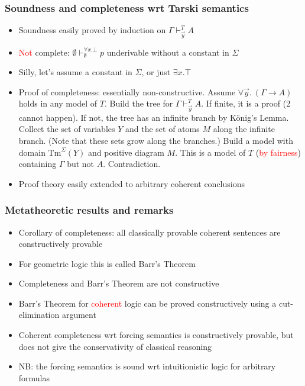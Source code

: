 \documentclass[handout,11pt]{beamer}
\newcommand{\red}[1]{\textcolor{red}{#1}}
\begin{document}
\begin{frame}
\frametitle{Soundness and completeness wrt Tarski semantics}
 \begin{itemize}[<+->]   %
    \item Soundness easily proved by induction on $\Gamma\vdash_{\vec{y}}^T A$
    \item \red{Not} complete: $\emptyset\vdash_{\emptyset}^{\forall x.\bot} p$
    underivable without a constant in $\Sigma$
    \item Silly, let's assume a constant in $\Sigma$, or just $\exists x.\top$
    \item Proof of completeness: essentially non-constructive.
    Assume $\forall\vec{y}.~(\Gamma \to A)$ holds in any model of $T$.
    Build the tree for $\Gamma\vdash_{\vec{y}}^T A$. If finite, 
    it is a proof (2 cannot happen). If not, the tree has an infinite branch
    by K\"onig's Lemma. Collect the set of variables $Y$ and the set
    of atoms $M$ along the infinite branch. 
    (Note that these sets grow along the branches.)
    Build a model with domain
    $\mathrm{Tm}^\Sigma(Y)$ and positive diagram $M$. This is a model of
    $T$ (\red{by fairness}) containing $\Gamma$ but not $A$. Contradiction.
 
    \item Proof theory easily extended to arbitrary coherent conclusions
 \end{itemize}
\end{frame}

\begin{frame}
\frametitle{Metatheoretic results and remarks}
 \begin{itemize}[<+->]   %
    \item Corollary of completeness: 
    all classically provable coherent sentences are constructively provable
    \item For \alert{geometric} logic this is called Barr's Theorem
    \item Completeness and Barr's Theorem are \alert{not} constructive
    \item Barr's Theorem for \red{coherent} logic can be proved 
    constructively using a cut-elimination argument %
    \item Coherent completeness wrt forcing semantics is constructively
    provable, but does not give the conservativity of classical reasoning
    \item NB: the forcing semantics is sound wrt intuitionistic logic 
    for arbitrary formulas
 \end{itemize}
\end{frame}
\end{document}
